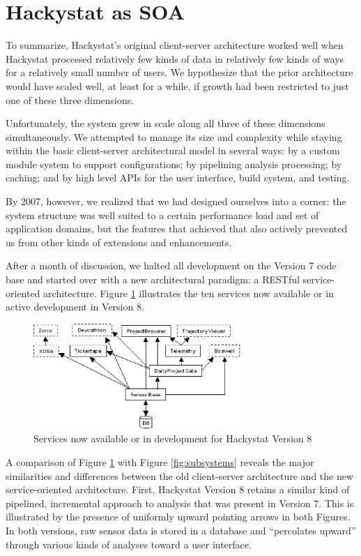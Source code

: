 \documentclass[conference,compsoc,peerreview]{IEEEtran}
\begin{document}
\section{Hackystat as SOA}
\label{sec:soa}

To summarize, Hackystat's original client-server architecture worked well
when Hackystat processed relatively few kinds of data in relatively few
kinds of ways for a relatively small number of users.  We hypothesize that
the prior architecture would have scaled well, at least for a while, if
growth had been restricted to just one of these three dimensions.

Unfortunately, the system grew in scale along all three of these dimensions
simultaneously.  We attempted to manage its size and complexity while
staying within the basic client-server architectural model in several ways:
by a custom module system to support configurations; by pipelining analysis
processing; by caching; and by high level APIs for the user interface,
build system, and testing.

By 2007, however, we realized that we had designed ourselves into a
corner: the system structure was well suited to a certain performance
load and set of application domains, but the features that achieved that
also actively prevented us from other kinds of extensions and enhancements.

After a month of discussion, we halted all development on the Version 7
code base and started over with a new architectural paradigm: a RESTful
service-oriented architecture.  Figure \ref{fig:soa} illustrates the
ten services now available or in active development in Version 8.

\begin{figure}[ht]
  \center
  \includegraphics[width=0.7\textwidth]{soa.eps}
  \caption{Services now available or in development for Hackystat Version 8}
  \label{fig:soa}
\end{figure} 

A comparison of Figure \ref{fig:soa} with Figure \ref{fig:subsystems}
reveals the major similarities and differences between the old
client-server architecture and the new service-oriented architecture.
First, Hackystat Version 8 retains a similar kind of pipelined, incremental
approach to analysis that was present in Version 7. This is illustrated by
the presence of uniformly upward pointing arrows in both Figures.  In both
versions, raw sensor data is stored in a database and ``percolates upward''
through various kinds of analyses toward a user interface.
\end{document}
